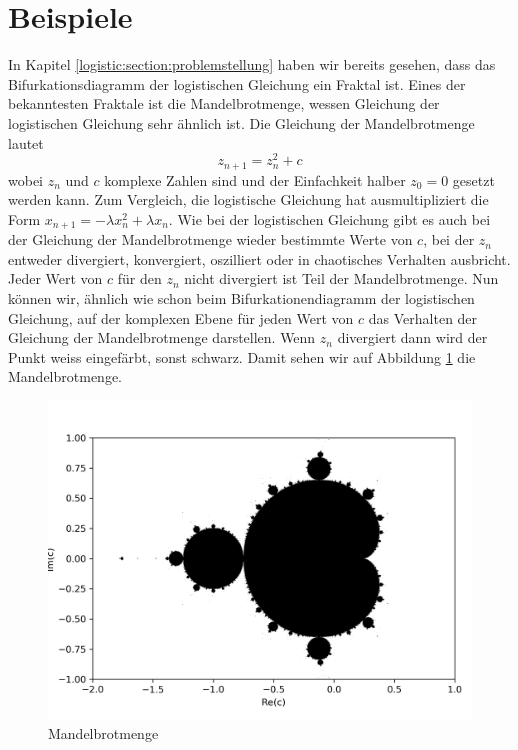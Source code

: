 %
%
%
\section{Beispiele
\label{logistic:section:folgerungen}}

In Kapitel \ref{logistic:section:problemstellung} 
haben wir bereits gesehen, 
dass das Bifurkationsdiagramm der logistischen Gleichung
ein Fraktal ist. 
Eines der bekanntesten Fraktale ist die Mandelbrotmenge,
wessen Gleichung der logistischen Gleichung sehr ähnlich ist. 
Die Gleichung der Mandelbrotmenge lautet
\begin{equation}
    z_{n+1} = z_n^2 + c
    \label{eq:mandelbrot}
\end{equation}
wobei $z_n$ und $c$ komplexe Zahlen sind und 
der Einfachkeit halber $z_0 = 0$ gesetzt werden kann.
Zum Vergleich, die logistische Gleichung hat ausmultipliziert
die Form $x_{n+1} = -\lambda x_n^2 +\lambda x_n$. 
Wie bei der logistischen Gleichung gibt es auch
bei der Gleichung der Mandelbrotmenge wieder bestimmte
Werte von $c$, bei der $z_n$ entweder 
divergiert, 
konvergiert, 
oszilliert 
oder in chaotisches Verhalten ausbricht. 
Jeder Wert von $c$ für den $z_n$ nicht 
divergiert ist Teil der Mandelbrotmenge. 
Nun können wir, ähnlich wie schon beim 
Bifurkationendiagramm der logistischen Gleichung, auf der
komplexen Ebene für jeden Wert von $c$ das Verhalten
der Gleichung der Mandelbrotmenge darstellen. 
Wenn $z_n$ divergiert dann wird der Punkt weiss
eingefärbt, sonst schwarz. 
Damit sehen wir auf Abbildung \ref{fig:mandel_2d}
die Mandelbrotmenge. 
\begin{figure}
    \includegraphics[width=\linewidth]{papers/logistic/figures/mandel.png}
    \caption{Mandelbrotmenge}
    \label{fig:mandel_2d}
\end{figure}

